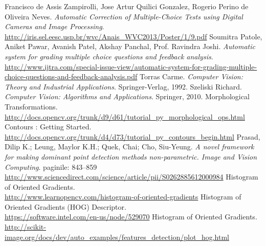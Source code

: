 \documentclass[a4paper,12pt]{report}
\begin{document}
\begin{thebibliography}{9}
Francisco de Assis Zampirolli, Jose Artur Quilici Gonzalez, Rogerio Perino de Oliveira Neves. \textit{Automatic Correction of Multiple-Choice Tests using Digital Cameras and Image Processing}. \\
\href{http://iris.sel.eesc.usp.br/wvc/Anais_WVC2013/Poster/1/9.pdf}{http://iris.sel.eesc.usp.br/wvc/Anais\_WVC2013/Poster/1/9.pdf}
Soumitra Patole, Aniket Pawar, Avanish Patel, Akshay Panchal, Prof. Ravindra Joshi. \textit{Automatic system for grading multiple choice questions and feedback analysis}. \\
\href{http://www.ijtra.com/special-issue-view/automatic-system-for-grading-multiple-choice-questions-and-feedback-analysis.pdf}{http://www.ijtra.com/special-issue-view/automatic-system-for-grading-multiple-choice-questions-and-feedback-analysis.pdf}
Torras Carme. \textit{Computer Vision: Theory and Industrial Applications}. Springer-Verlag, 1992.
Szeliski Richard. \textit{Computer Vision: Algorithms and Applications}. Springer, 2010.
Morphological Transformations. \\
\href{http://docs.opencv.org/trunk/d9/d61/tutorial_py_morphological_ops.html}{http://docs.opencv.org/trunk/d9/d61/tutorial\_py\_morphological\_ops.html}
Contours : Getting Started. \\
\href{http://docs.opencv.org/trunk/d4/d73/tutorial\_py\_contours\_begin.html}{http://docs.opencv.org/trunk/d4/d73/tutorial\_py\_contours\_begin.html}
Prasad, Dilip K.; Leung, Maylor K.H.; Quek, Chai; Cho, Siu-Yeung. \textit{A novel framework for making dominant point detection methods non-parametric. Image and Vision Computing}. paginile: 843–859\\
\href{http://www.sciencedirect.com/science/article/pii/S0262885612000984}{http://www.sciencedirect.com/science/article/pii/S0262885612000984}
Histogram of Oriented Gradients. \\
\href{http://www.learnopencv.com/histogram-of-oriented-gradients}{http://www.learnopencv.com/histogram-of-oriented-gradients}
Histogram of Oriented Gradients (HOG) Descriptor. \\
\href{https://software.intel.com/en-us/node/529070}{https://software.intel.com/en-us/node/529070}
Histogram of Oriented Gradients. \\
\href{http://scikit-image.org/docs/dev/auto\_examples/features\_detection/plot\_hog.html}{http://scikit-image.org/docs/dev/auto\_examples/features\_detection/plot\_hog.html}

\end{thebibliography}
\end{document}
